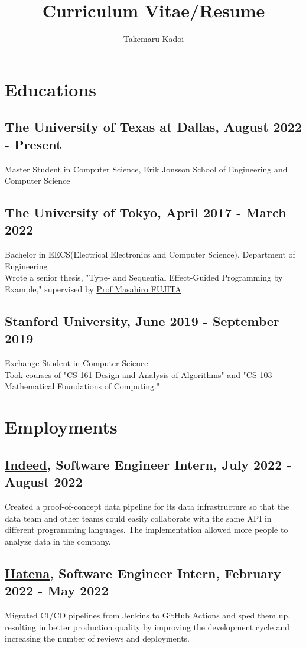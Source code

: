 \documentclass[10pt]{article}
\title{\vspace{-1cm}Curriculum Vitae/Resume}
\author{Takemaru Kadoi}
\date{}
\begin{document}
\section*{Educations}
  \subsection*{The University of Texas at Dallas, August 2022 - Present}
    Master Student in Computer Science, Erik Jonsson School of Engineering and Computer Science
  \subsection*{The University of Tokyo, April 2017 - March 2022}
    Bachelor in EECS(Electrical Electronics and Computer Science), Department of Engineering
    \\
    Wrote a senior thesis, "Type- and Sequential Effect-Guided Programming by Example," supervised by \href{https://scholar.google.com/citations?user=tYabznkAAAAJ}{Prof Masahiro FUJITA}
  \subsection*{Stanford University, June 2019 - September 2019}
    Exchange Student in Computer Science
    \\
    Took courses of "CS 161 Design and Analysis of Algorithms" and "CS 103 Mathematical Foundations of Computing."

\section*{Employments}
  \subsection*{\href{https://www.indeed.com/about}{Indeed}, Software Engineer Intern, July 2022 - August 2022}
    Created a proof-of-concept data pipeline for its data infrastructure so that the data team and other teams could easily collaborate with the same API in different programming languages.
    The implementation allowed more people to analyze data in the company.
  \subsection*{\href{https://hatenacorp.jp/}{Hatena}, Software Engineer Intern, February 2022 - May 2022}
    Migrated CI/CD pipelines from Jenkins to GitHub Actions and sped them up, resulting in better production quality by improving the development cycle and increasing the number of reviews and deployments.
\end{document}
